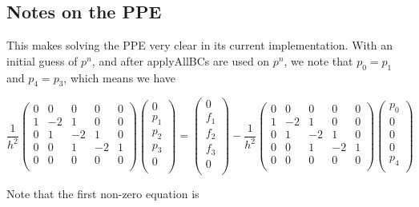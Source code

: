 \documentclass[11pt]{article}
\begin{document}
\subsection{Notes on the PPE}
This makes solving the PPE very clear in its current implementation. With an initial guess of $p^n$, and after applyAllBCs are used on $p^n$, we note that $p_0=p_1$ and $p_4=p_3$, which means we have

\begin{equation}
\frac{1}{h^2}
 \begin{pmatrix}
  0 &  0 &  0 &  0 &  0 \\
  1 & -2 &  1 &  0 &  0 \\
  0 &  1 & -2 &  1 &  0 \\
  0 &  0 &  1 & -2 &  1 \\
  0 &  0 &  0 &  0 &  0 \\
 \end{pmatrix}
 \begin{pmatrix}
  0 \\  p_1 \\  p_2 \\  p_3 \\  0 \\
 \end{pmatrix}
  = 
 \begin{pmatrix}
  0 \\  f_1 \\  f_2 \\  f_3 \\  0 \\
 \end{pmatrix}
   -
\frac{1}{h^2}
 \begin{pmatrix}
  0 &  0 &  0 &  0 &  0 \\
  1 & -2 &  1 &  0 &  0 \\
  0 &  1 & -2 &  1 &  0 \\
  0 &  0 &  1 & -2 &  1 \\
  0 &  0 &  0 &  0 &  0 \\
 \end{pmatrix}
 \begin{pmatrix}
  p_0 \\  0 \\  0 \\  0 \\  p_4 \\
 \end{pmatrix}
\end{equation}

Note that the first non-zero equation is 
\end{document}
